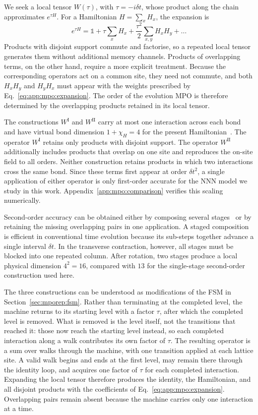 We seek a local tensor $W(\tau)$, with $\tau=-i\delta t$, whose product along the chain approximates $e^{\tau H}$. For a Hamiltonian $H=\sum_x H_x$, the expansion is
\begin{equation}
  e^{\tau H} = \mathbb{1} + \tau\sum_x H_x
  + \frac{\tau^2}{2}\sum_{x,y} H_xH_y + \dots
  \label{eq:app:mpo:expansion}
\end{equation}
Products with disjoint support commute and factorise, so a repeated local tensor generates them without additional memory channels. Products of overlapping terms, on the other hand, require a more explicit treatment. Because the corresponding operators act on a common site, they need not commute, and both $H_xH_y$ and $H_yH_x$ must appear with the weights prescribed by Eq.~\eqref{eq:app:mpo:expansion}. The order of the evolution \ac{MPO} is therefore determined by the overlapping products retained in its local tensor.

The constructions $W^{\mathrm{I}}$ and $W^{\mathrm{II}}$ carry at most one interaction across each bond and have virtual bond dimension $1+\chi_H=4$ for the present Hamiltonian~\cite{zaletel2015}. The operator $W^{\mathrm{I}}$ retains only products with disjoint support. The operator $W^{\mathrm{II}}$ additionally includes products that overlap on one site and reproduces the on-site field to all orders. Neither construction retains products in which two interactions cross the same bond. Since these terms first appear at order $\delta t^2$, a single application of either operator is only first-order accurate for the \ac{NNN} model we study in this work. Appendix~\ref{app:mpo:comparison} verifies this scaling numerically.

Second-order accuracy can be obtained either by composing several stages~\cite{zaletel2015} or by retaining the missing overlapping pairs in one application. A staged composition is efficient in conventional time evolution because its sub-steps together advance a single interval $\delta t$. In the transverse contraction, however, all stages must be blocked into one repeated column. After rotation, two stages produce a local physical dimension $4^2=16$, compared with $13$ for the single-stage second-order construction used here.

The three constructions can be understood as modifications of the \ac{FSM} in Section~\ref{sec:mporep:fsm}. Rather than terminating at the completed level, the machine returns to its starting level with a factor $\tau$, after which the completed level is removed. What is removed is the level itself, not the transitions that reached it: those now reach the starting level instead, so each completed interaction along a walk contributes its own factor of $\tau$. The resulting operator is a sum over walks through the machine, with one transition applied at each lattice site. A valid walk begins and ends at the first level, may remain there through the identity loop, and acquires one factor of $\tau$ for each completed interaction. Expanding the local tensor therefore produces the identity, the Hamiltonian, and all disjoint products with the coefficients of Eq.~\eqref{eq:app:mpo:expansion}. Overlapping pairs remain absent because the machine carries only one interaction at a time.


